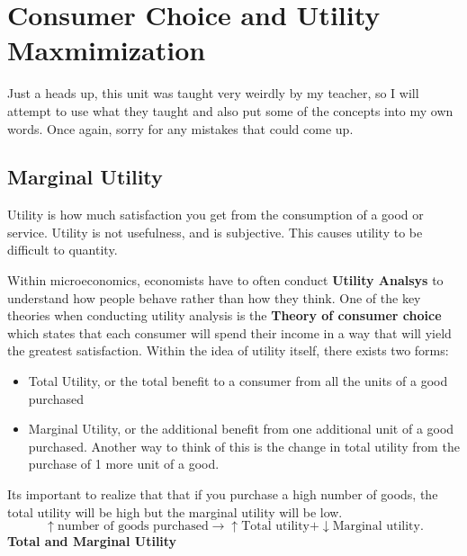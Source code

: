 \newpage
\chapter{\normalfont Consumer Choice and Utility Maxmimization}
Just a heads up, this unit was taught very weirdly by my teacher, so I will attempt to use what they taught and also put some of the concepts into my own words. Once again, sorry for any mistakes that could come up. 
\section{Marginal Utility}
\begin{definition}
    Utility is how much satisfaction you get from the consumption of a good or service. Utility is not usefulness, and is subjective. This causes utility to be difficult to quantity. 
\end{definition}
Within microeconomics, economists have to often conduct \textbf{Utility Analsys} to understand how people behave rather than how they think. One of the key theories when conducting utility analysis is the \textbf{Theory of consumer choice} which states that each consumer will spend their income in a way that will yield the greatest satisfaction.
Within the idea of utility itself, there exists two forms: 
\begin{itemize}
    \item Total Utility, or the total benefit to a consumer from all the units of a good purchased
    \item Marginal Utility, or the additional benefit from one additional unit of a good purchased. Another way to think of this is the change in total utility from the purchase of 1 more unit of a good. 
\end{itemize}
Its important to realize that that if you purchase a high number of goods, the total utility will be high but the marginal utility will be low.
\[
    \uparrow \text{number of goods purchased} \to \uparrow \text{Total utility} + \downarrow \text{Marginal utility}
.\] 
\textbf{Total and Marginal Utility}
